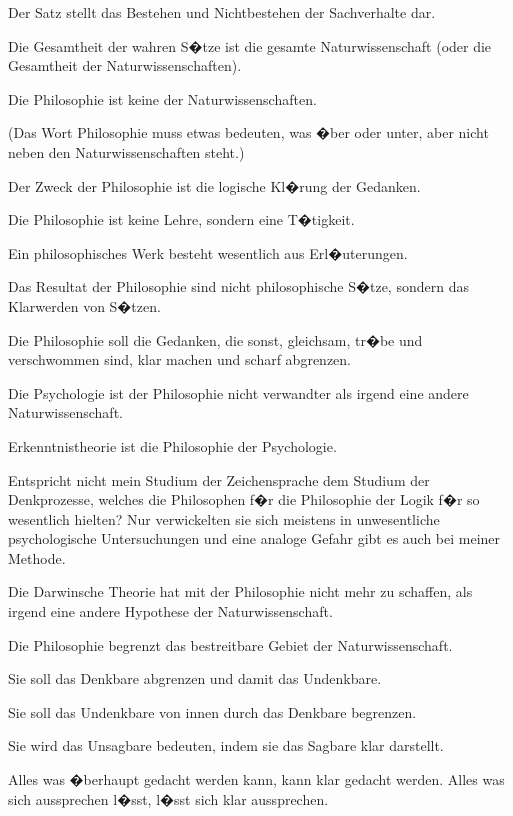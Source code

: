 \begin{propositions}
{Der Satz stellt das Bestehen und Nichtbestehen
der Sachverhalte dar.}


{Die Gesamtheit der wahren S�tze ist die
gesamte Naturwissenschaft (oder die Gesamtheit
der Naturwissenschaften).}


{Die Philosophie ist keine der Naturwissenschaften.

(Das Wort \glqq{}Philosophie\grqq{} muss etwas bedeuten,
was �ber oder unter, aber nicht neben den Naturwissenschaften
steht.)}


{Der Zweck der Philosophie ist die logische
Kl�rung der Gedanken.

Die Philosophie ist keine Lehre, sondern eine
T�tigkeit.

Ein philosophisches Werk besteht wesentlich
aus Erl�uterungen.

Das Resultat der Philosophie sind nicht \glqq{}philosophische
S�tze\grqq{}, sondern das Klarwerden von
S�tzen.

Die Philosophie soll die Gedanken, die sonst,
gleichsam, tr�be und verschwommen sind, klar
machen und scharf abgrenzen.}


{Die Psychologie ist der Philosophie nicht verwandter
als irgend eine andere Naturwissenschaft.

Erkenntnistheorie ist die Philosophie der
Psychologie.

Entspricht nicht mein Studium der Zeichensprache
dem Studium der Denkprozesse, welches
die Philosophen f�r die Philosophie der Logik f�r
so wesentlich hielten? Nur verwickelten sie sich
meistens in unwesentliche psychologische Untersuchungen
und eine analoge Gefahr gibt es auch
bei meiner Methode.}


{Die Darwinsche Theorie hat mit der Philosophie
nicht mehr zu schaffen, als irgend eine andere
Hypothese der Naturwissenschaft.}


{Die Philosophie begrenzt das bestreitbare
Gebiet der Naturwissenschaft.}


{Sie soll das Denkbare abgrenzen und damit das
Undenkbare.

Sie soll das Undenkbare von innen durch das
Denkbare begrenzen.}


{Sie wird das Unsagbare bedeuten, indem sie
das Sagbare klar darstellt.}


{Alles was �berhaupt gedacht werden kann,
kann klar gedacht werden. Alles was sich aussprechen
l�sst, l�sst sich klar aussprechen.}



\end{propositions}
